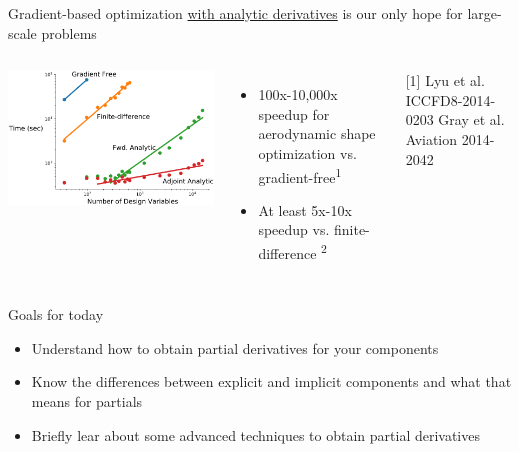 \documentclass[aspectratio=169, usenames, dvipsnames, 14pt]{beamer}
\begin{document}
\begin{frame}{Gradient-based optimization \underline{with analytic derivatives} is our only hope for large-scale problems}
	
	\begin{columns}
			\includegraphics[scale=.35]{images/slide_5_derivatives.png}
			\begin{itemize}
				\item 100x-10,000x speedup for aerodynamic shape optimization vs. gradient-free\textsuperscript{1}
				\item At least 5x-10x speedup vs. finite-difference \textsuperscript{2}
			\end{itemize}
			\footnotesize [1] Lyu et al. ICCFD8-2014-0203
			\footnotesize \newline [2] Gray et al. Aviation 2014-2042
	\end{columns}
	
\end{frame}
		
\begin{frame}{Goals for today}
	
	\begin{itemize}
		\item Understand how to obtain partial derivatives for your components
		\item Know the differences between explicit and implicit components and what that means for partials
		\item Briefly lear about some advanced techniques to obtain partial derivatives
	\end{itemize}

\end{frame}
\end{document}
